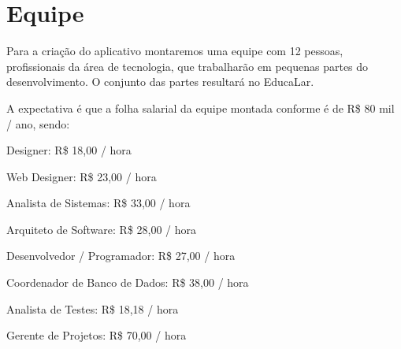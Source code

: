 \chapter[Equipe]{Equipe}

Para a criação do aplicativo montaremos uma equipe com 12 pessoas, profissionais da área de tecnologia, que trabalharão em pequenas partes do desenvolvimento. O conjunto das partes resultará no EducaLar.




    A expectativa é que a folha salarial da equipe montada conforme é de R\$ 80 mil / ano, sendo:
        
    \begin{alineas}
        \item Designer: R\$ 18,00 / hora
        \item Web Designer: R\$ 23,00 / hora
        \item Analista de Sistemas: R\$ 33,00 / hora
        \item Arquiteto de Software: R\$ 28,00 / hora
        \item Desenvolvedor / Programador: R\$ 27,00 / hora
        \item Coordenador de Banco de Dados: R\$ 38,00 / hora
        \item Analista de Testes: R\$ 18,18 / hora
        \item Gerente de Projetos: R\$ 70,00 / hora
\end{alineas}

